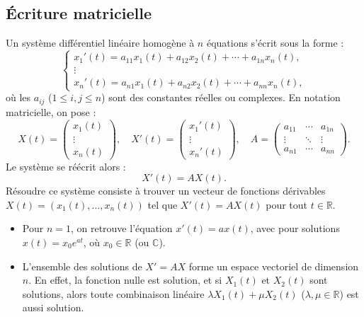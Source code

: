 \subsection{Écriture matricielle}
Un système différentiel linéaire homogène à \( n \) équations s'écrit sous la forme :
\begin{equation}
\begin{cases}
x_1'(t) = a_{11}x_1(t) + a_{12}x_2(t) + \cdots + a_{1n}x_n(t), \\
\vdots \\
x_n'(t) = a_{n1}x_1(t) + a_{n2}x_2(t) + \cdots + a_{nn}x_n(t),
\end{cases}
\end{equation}
où les \( a_{ij} \) (\( 1 \leq i, j \leq n \)) sont des constantes réelles ou complexes. En notation matricielle, on pose :
\[
X(t) = \begin{pmatrix} x_1(t) \\ \vdots \\ x_n(t) \end{pmatrix}, \quad X'(t) = \begin{pmatrix} x_1'(t) \\ \vdots \\ x_n'(t) \end{pmatrix}, \quad A = \begin{pmatrix} a_{11} & \cdots & a_{1n} \\ \vdots & \ddots & \vdots \\ a_{n1} & \cdots & a_{nn} \end{pmatrix}.
\]
Le système se réécrit alors :
\[
X'(t) = AX(t).
\]
Résoudre ce système consiste à trouver un vecteur de fonctions dérivables \( X(t) = (x_1(t), \dots, x_n(t)) \) tel que \( X'(t) = AX(t) \) pour tout \( t \in \mathbb{R} \).

\begin{remarque}
	\begin{itemize}
		\item Pour \( n = 1 \), on retrouve l'équation \( x'(t) = ax(t) \), avec pour solutions \( x(t) = x_0 e^{at} \), où \( x_0 \in \mathbb{R} \) (ou \( \mathbb{C} \)).
		\item L'ensemble des solutions de \( X' = AX \) forme un espace vectoriel de dimension \( n \). En effet, la fonction nulle est solution, et si \( X_1(t) \) et \( X_2(t) \) sont solutions, alors toute combinaison linéaire \( \lambda X_1(t) + \mu X_2(t) \) (\( \lambda, \mu \in \mathbb{R} \)) est aussi solution.
	\end{itemize}
\end{remarque}

